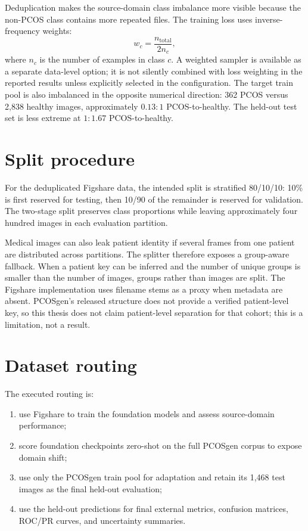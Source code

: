 \documentclass[../preamble.tex]{subfiles}
\begin{document}
Deduplication makes the source-domain class imbalance more visible because
the non-PCOS class contains more repeated files. The training loss uses
inverse-frequency weights:
\begin{equation}
  w_c = \frac{n_{\mathrm{total}}}{2n_c},
  \label{eq:class-weight}
\end{equation}
where $n_c$ is the number of examples in class $c$. A weighted sampler is
available as a separate data-level option; it is not silently combined with
loss weighting in the reported results unless explicitly selected in the
configuration. The target train pool is also imbalanced in the opposite
numerical direction: 362 PCOS versus 2{,}838 healthy images, approximately
$0.13{:}1$ PCOS-to-healthy. The held-out test set is less extreme at
$1{:}1.67$ PCOS-to-healthy.

\section{Split procedure}
\label{sec:data-split}

For the deduplicated Figshare data, the intended split is stratified 80/10/10:
10\% is first reserved for testing, then 10/90 of the remainder is reserved
for validation. The two-stage split preserves class proportions while leaving
approximately four hundred images in each evaluation partition.

Medical images can also leak patient identity if several frames from one
patient are distributed across partitions. The splitter therefore exposes a
group-aware fallback. When a patient key can be inferred and the number of
unique groups is smaller than the number of images, groups rather than images
are split. The Figshare implementation uses filename stems as a proxy when
metadata are absent. PCOSgen's released structure does not provide a verified
patient-level key, so this thesis does not claim patient-level separation for
that cohort; this is a limitation, not a result.

\section{Dataset routing}
\label{sec:data-routing}

The executed routing is:
\begin{enumerate}
  \item use Figshare to train the foundation models and assess source-domain
        performance;
  \item score foundation checkpoints zero-shot on the full PCOSgen corpus to
        expose domain shift;
  \item use only the PCOSgen train pool for adaptation and retain its 1{,}468
        test images as the final held-out evaluation;
  \item use the held-out predictions for final external metrics, confusion
        matrices, ROC/PR curves, and uncertainty summaries.
\end{enumerate}
\end{document}
